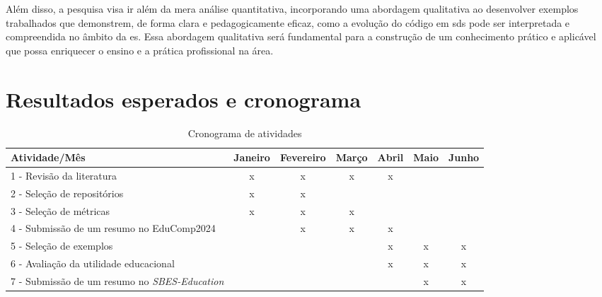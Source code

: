 Além disso, a pesquisa visa ir além da mera análise quantitativa, incorporando uma abordagem qualitativa ao desenvolver exemplos trabalhados que demonstrem, de forma clara e pedagogicamente eficaz, como a evolução do código em \gls{sds} pode ser interpretada e compreendida no âmbito da \gls{es}. Essa abordagem qualitativa será fundamental para a construção de um conhecimento prático e aplicável que possa enriquecer o ensino e a prática profissional na área.

\section{Resultados esperados e cronograma}

\begin{table}[b]
\centering
\caption{Cronograma de atividades}
\label{table:schedule}
\begin{tabular}{lcccccc}
Atividade/Mês & Janeiro & Fevereiro & Março & Abril & Maio & Junho  \\
\hline
1 - Revisão da literatura & x & x & x & x & & \\
2 - Seleção de repositórios & x & x & & & & \\
3 - Seleção de métricas & x & x & x & & & \\
4 - Submissão de um resumo no EduComp2024 & & x & x & x & & \\
5 - Seleção de exemplos & & & & x & x & x \\
6 - Avaliação da utilidade educacional & & & & x & x & x \\
7 - Submissão de um resumo no \textit{SBES-Education} & & & & & x & x
\end{tabular}
\end{table}

